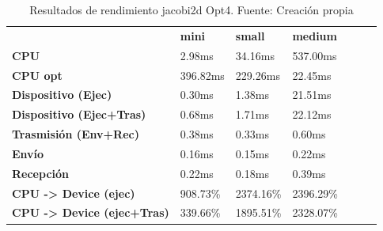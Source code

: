 \begin{table}[H]
    \centering
    \begin{tabular}{lllllll}
    \rowcolor[HTML]{DAE8FC} \ &  \textbf{mini} &  \textbf{	small} &  \textbf{	medium} \\
    \cellcolor[HTML]{DAE8FC} \textbf{CPU} & 2.98ms & 	34.16ms & 	537.00ms \\
    \rowcolor[HTML]{EFEFEF} \cellcolor[HTML]{DAE8FC} \textbf{CPU opt} & 396.82ms & 	229.26ms & 	22.45ms \\
    \cellcolor[HTML]{DAE8FC} \textbf{Dispositivo (Ejec)} & 0.30ms & 	1.38ms & 	21.51ms \\
    \rowcolor[HTML]{EFEFEF} \cellcolor[HTML]{DAE8FC} \textbf{Dispositivo (Ejec+Tras)} & 0.68ms & 	1.71ms & 	22.12ms \\
    \cellcolor[HTML]{DAE8FC} \textbf{Trasmisión (Env+Rec)} & 0.38ms & 	0.33ms & 	0.60ms \\
    \rowcolor[HTML]{EFEFEF} \cellcolor[HTML]{DAE8FC} \textbf{Envío} & 0.16ms & 	0.15ms & 	0.22ms \\
    \cellcolor[HTML]{DAE8FC} \textbf{Recepción} & 0.22ms & 	0.18ms & 	0.39ms \\
    \rowcolor[HTML]{EFEFEF} \cellcolor[HTML]{DAE8FC} \textbf{CPU -> Device (ejec)} & 908.73\% & 	2374.16\% & 	2396.29\% \\
    \cellcolor[HTML]{DAE8FC} \textbf{CPU -> Device (ejec+Tras)} & 339.66\% & 	1895.51\% & 	2328.07\% \\
    \end{tabular}
    \caption[Resultados de rendimiento jacobi2d Opt4]{{Resultados de rendimiento jacobi2d Opt4. Fuente: Creación propia}}
    \label{table_test_jacobi2d_Opt4_hw_performanceResults}
\end{table}